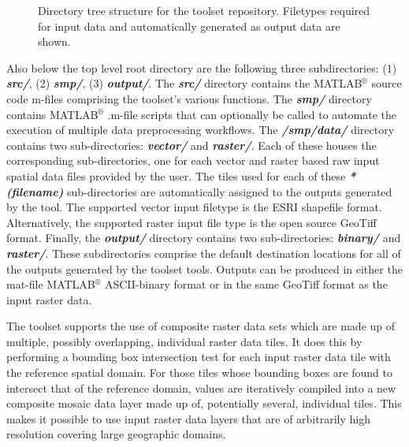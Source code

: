         \begin{figure}[!h]
            \caption{Directory tree structure for the toolset repository. Filetypes required for input data and automatically generated as output data are shown.}
              \label{fig:Directory}
        \end{figure}
        
Also below the top level root directory are the following three subdirectories: (1) \textit{\textbf{src/}}, (2) \textit{\textbf{smp/}}, (3) \textit{\textbf{output/}}. The \textit{\textbf{src/}} directory contains the MATLAB$^{\circledR}$ source code m-files comprising the toolset's various functions. The \textit{\textbf{smp/}} directory contains MATLAB$^{\circledR}$ .m-file scripts that can optionally be called to automate the execution of multiple data preprocessing workflows. The \textit{\textbf{/smp/data/}} directory contains two sub-directories: \textit{\textbf{vector/}} and \textit{\textbf{raster/}}. Each of these houses the corresponding sub-directories, one for each vector and raster based raw input spatial data files provided by the user. The tiles used for each of these \textit{\textbf{*(filename)}} sub-directories are automatically assigned to the outputs generated by the tool. The supported vector input filetype is the ESRI shapefile format. Alternatively, the supported raster input file type is the open source GeoTiff format. Finally, the \textit{\textbf{output/}} directory contains two sub-directories: \textit{\textbf{binary/}} and \textit{\textbf{raster/}}. These subdirectories comprise the default destination locations for all of the outputs generated by the toolset tools. Outputs can be produced in either the mat-file MATLAB$^{\circledR}$ ASCII-binary format or in the same GeoTiff format as the input raster data.

The toolset supports the use of composite raster data sets which are made up of multiple, possibly overlapping, individual raster data tiles. It does this by performing a bounding box intersection test for each input raster data tile with the reference spatial domain. For those tiles whose bounding boxes are found to intersect that of the reference domain, values are iteratively compiled into a new composite mosaic data layer made up of, potentially several, individual tiles. This makes it possible to use input raster data layers that are of arbitrarily high resolution covering large geographic domains.


